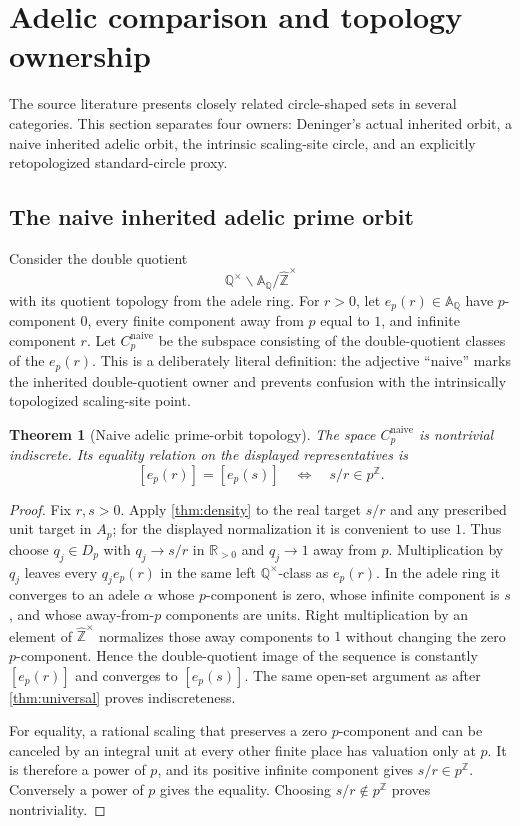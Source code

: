 \documentclass[11pt]{article}
\newtheorem{theorem}{Theorem}[section]
\theoremstyle{definition}
\newcommand{\A}{\mathbb{A}}
\newcommand{\Q}{\mathbb{Q}}
\newcommand{\R}{\mathbb{R}}
\newcommand{\Z}{\mathbb{Z}}
\newcommand{\Zhat}{\widehat{\mathbb Z}}
\begin{document}
\section{Adelic comparison and topology ownership}\label{sec:adelic}

The source literature presents closely related circle-shaped sets in several categories.  This section separates four owners: Deninger's actual inherited orbit, a naive inherited adelic orbit, the intrinsic scaling-site circle, and an explicitly retopologized standard-circle proxy.

\subsection{The naive inherited adelic prime orbit}

Consider the double quotient
\[
 \Q^\times\backslash\A_{\Q}/\Zhat^\times
\]
with its quotient topology from the adele ring.  For \(r>0\), let \(e_p(r)\in\A_{\Q}\) have \(p\)-component \(0\), every finite component away from \(p\) equal to \(1\), and infinite component \(r\).  Let \(C_p^{\mathrm{naive}}\) be the subspace consisting of the double-quotient classes of the \(e_p(r)\).  This is a deliberately literal definition: the adjective ``naive'' marks the inherited double-quotient owner and prevents confusion with the intrinsically topologized scaling-site point.

\begin{theorem}[Naive adelic prime-orbit topology]\label{thm:adelic}
The space \(C_p^{\mathrm{naive}}\) is nontrivial indiscrete.  Its equality relation on the displayed representatives is
\[
 [e_p(r)]=[e_p(s)]\quad\Longleftrightarrow\quad s/r\in p^{\Z}.
\]
\end{theorem}

\begin{proof}
Fix \(r,s>0\).  Apply \cref{thm:density} to the real target \(s/r\) and any prescribed unit target in \(A_p\); for the displayed normalization it is convenient to use \(1\).  Thus choose \(q_j\in D_p\) with \(q_j\to s/r\) in \(\R_{>0}\) and \(q_j\to1\) away from \(p\).  Multiplication by \(q_j\) leaves every \(q_je_p(r)\) in the same left \(\Q^\times\)-class as \(e_p(r)\).  In the adele ring it converges to an adele \(\alpha\) whose \(p\)-component is zero, whose infinite component is \(s\), and whose away-from-\(p\) components are units.  Right multiplication by an element of \(\Zhat^\times\) normalizes those away components to \(1\) without changing the zero \(p\)-component.  Hence the double-quotient image of the sequence is constantly \([e_p(r)]\) and converges to \([e_p(s)]\).  The same open-set argument as after \cref{thm:universal} proves indiscreteness.

For equality, a rational scaling that preserves a zero \(p\)-component and can be canceled by an integral unit at every other finite place has valuation only at \(p\).  It is therefore a power of \(p\), and its positive infinite component gives \(s/r\in p^{\Z}\).  Conversely a power of \(p\) gives the equality.  Choosing \(s/r\notin p^{\Z}\) proves nontriviality.
\end{proof}
\end{document}
